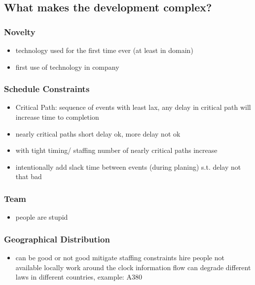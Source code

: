 \documentclass[a4paper, 10pt]{article}
\begin{document}
\subsection*{What makes the development complex?}
\subsubsection*{Novelty}
\begin{itemize}
    \item technology used for the first time ever (at least in domain)
    \item first use of technology in company
\end{itemize}

\subsubsection*{Schedule Constraints}
\begin{itemize}
    \item Critical Path: sequence of events with least lax, any delay in critical path will increase time to completion
    \item nearly critical paths \follows short delay ok, more delay not ok
    \item with tight timing/ staffing \follows number of nearly critical paths increase
    \item intentionally add slack time between events (during planing) s.t. delay not that bad
\end{itemize}

\subsubsection*{Team}
\begin{itemize}
    \item people are stupid
\end{itemize}

\subsubsection*{Geographical Distribution}
\begin{itemize}
    \item can be good or not good
    \good mitigate staffing constraints
    \good hire people not available locally
    \good work around the clock
    \bad information flow can degrade
    \bad different laws in different countries, example: A380
\end{itemize}
\end{document}
